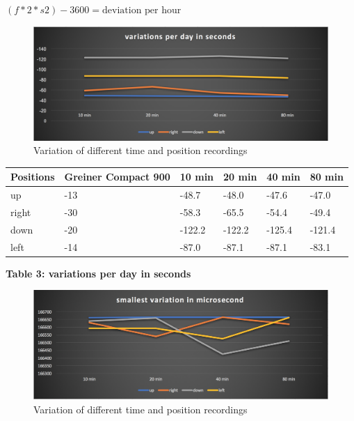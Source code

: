 \documentclass[12pt, a4paper]{report}
\begin{document}
\((f*2*s2)-3600=\text{deviation per hour}\)

\bigskip
\noindent
\begin{figure}
\centering
    \includegraphics[scale=0.3]{Images/variations_per_day.png}

\caption{ Variation of different time and position recordings}
\end{figure}    

\begin{table}[H]
    \begin{tabular}{|l|l|l|l|l|l|}
    \hline
    Positions & Greiner Compact 900 & 10 min & 20 min & 40 min & 80 min \\ \hline
    up        & -13                 & -48.7     & -48.0     & -47.6      & -47.0      \\ \hline
    right     & -30                 & -58.3      & -65.5    & -54.4      & -49.4      \\ \hline
    down      & -20                 & -122.2    & -122.2     & -125.4    & -121.4      \\ \hline
    left      & -14                 & -87.0	   & -87.1	  & -87.1	  & -83.1      \\ \hline
    \end{tabular}
\end{table}
\begin{center}    
{\bf Table 3: variations per day in seconds} 
\end{center}

\bigskip
\noindent
\begin{figure}
\centering
\includegraphics[scale=0.3]{Images/smallest_variation.png}

\caption{ Variation of different time and position recordings}
\end{figure} 
\end{document}
